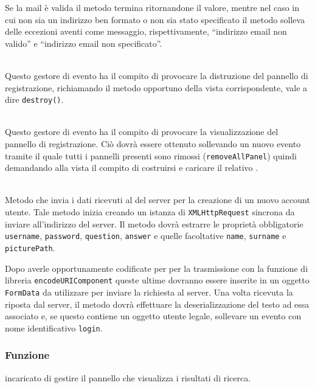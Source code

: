 \begin{description}
Se la mail è valida il metodo termina ritornandone il valore, mentre nel caso in cui non sia un indirizzo ben formato o non sia stato specificato il metodo solleva delle eccezioni aventi come messaggio, rispettivamente, ``indirizzo email non valido'' e ``indirizzo email non specificato''.

	\item{}\\
	Questo gestore di evento ha il compito di provocare la distruzione del pannello di registrazione, richiamando il metodo opportuno della vista corrispondente, vale a dire \verb+destroy()+.
	
	\item{}\\
	Questo gestore di evento ha il compito di provocare la visualizzazione del pannello di registrazione. Ciò dovrà essere ottenuto sollevando un nuovo evento tramite il quale tutti i pannelli presenti sono rimossi (\verb'removeAllPanel') quindi demandando alla vista il compito di costruirsi e caricare il relativo .
	
	\item{}\\
	Metodo che invia i dati ricevuti al  del server per la creazione di un nuovo account utente. Tale metodo inizia creando un istanza di \texttt{XMLHttpRequest} sincrona da inviare all'indirizzo del server. Il metodo dovrà estrarre le proprietà obbligatorie \verb'username', \verb'password', \verb'question', \verb'answer' e quelle facoltative \verb'name', \verb'surname' e \verb'picturePath'.
	
	Dopo averle opportunamente codificate per per la trasmissione con la funzione di libreria \verb'encodeURIComponent' queste ultime dovranno essere inserite in un oggetto \verb'FormData' da utilizzare per inviare la richiesta al server. Una volta ricevuta la riposta dal server, il metodo dovrà effettuare la deserializzazione del testo ad essa associato e, se questo contiene un oggetto utente legale, sollevare un evento con nome identificativo \verb'login'.

\end{description}



\subsubsection*{Funzione}
 incaricato di gestire il pannello che visualizza i risultati di ricerca.

